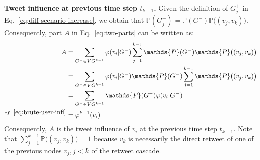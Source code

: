 

\textbf{Tweet influence at previous time step $t_{k-1}$.}
Given the definition of $G_j^+$ in Eq.~\eqref{eq:diff-scenario-increase}, we obtain that $\mathds{P}(G_j^+) = \mathds{P}(G^-)\mathds{P}\big((v_j,v_k)\big)$.
Consequently, part $A$ in Eq.~\eqref{eq:two-parts} can be written as:
\begin{align}
	A 	&= \sum_{G^- \in {VG^{k-1}}} \varphi(v_i | G^-) \sum^{k-1}_{j=1} \mathds{P}(G^-)\mathds{P}\big((v_j,v_k)\big) \nonumber \\
		&= \sum_{G^- \in {VG^{k-1}}} \varphi(v_i | G^-) \mathds{P}(G^-) \sum^{k-1}_{j=1} \mathds{P}\big((v_j,v_k)\big) \nonumber \\
		&= \sum_{G^- \in {VG^{k-1}}} \mathds{P}(G^-) \varphi(v_i | G^-)  \nonumber \\
	^{cf.~\eqref{eq:brute-user-infl}}	&= \varphi^{k-1}(v_i) \label{eq:past-infl}
\end{align}
Consequently, $A$ is the tweet influence of $v_i$ at the previous time step $t_{k-1}$.
Note that $\sum^{k-1}_{j=1} \mathds{P}\big((v_j,v_k)\big) = 1$ because $v_k$ is necessarily the direct retweet of one of the previous nodes $v_j, j < k$ of the retweet cascade.
%

